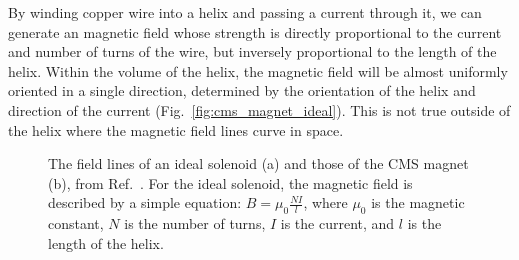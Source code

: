 By winding copper wire into a helix and passing a current through it, we can generate an magnetic field whose strength is directly proportional to the current and number of turns of the wire, but inversely proportional to the length of the helix. 
Within the volume of the helix, the magnetic field will be almost uniformly oriented in a single direction, determined by the orientation of the helix and direction of the current (Fig.~\ref{fig:cms_magnet_ideal}). 
This is not true outside of the helix where the magnetic field lines curve in space. 

\begin{figure}[htb]
    \centering
    \quad
    \caption[The field lines of an ideal solenoid and those of the CMS magnet, from Ref.~\cite{CMS:2009moq}]{
        The field lines of an ideal solenoid (a) and those of the CMS magnet (b), from Ref.~\cite{CMS:2009moq}. %
        For the ideal solenoid, the magnetic field is described by a simple equation: $B = \mu_0\frac{NI}{l}$, where $\mu_0$ is the magnetic constant, $N$ is the number of turns, $I$ is the current, and $l$ is the length of the helix. 
    }
    \label{fig:cms_fields}
\end{figure}

